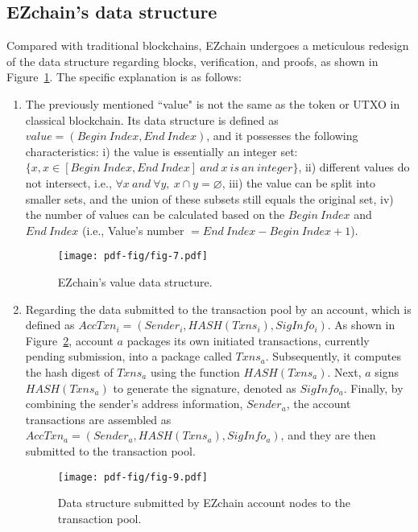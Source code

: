 \documentclass[conference]{IEEEtran}
\begin{document}
\subsection{EZchain's data structure}
\label{subsec:EZchain's data structure}
Compared with traditional blockchains, EZchain undergoes a meticulous redesign of the data structure regarding blocks, verification, and proofs, as shown in Figure~\ref{fig:value data structure}. The specific explanation is as follows:
\begin{enumerate}
    \item The previously mentioned ``value" is not the same as the token or UTXO in classical blockchain. Its data structure is defined as $value=(Begin~Index, End~Index)$, and it possesses the following characteristics: i) the value is essentially an integer set: $\{x, x \in [Begin~Index, End~Index]~and~x~is~an~integer\}$, ii) different values do not intersect, i.e., $\forall{x}~and~\forall{y},~x \cap y = \varnothing$, iii) the value can be split into smaller sets, and the union of these subsets still equals the original set, iv) the number of values can be calculated based on the $Begin~Index$ and $End~Index$ (i.e., Value's number $= End~Index - Begin~Index + 1$).
    \begin{figure}[htp!]
        \centering
        \texttt{[image: pdf-fig/fig-7.pdf]}
        \caption{EZchain's value data structure.}
        \label{fig:value data structure}
    \end{figure}

    \item Regarding the data submitted to the transaction pool by an account, which is defined as $AccTxn_i = (Sender_i, HASH(Txns_i), SigInfo_i)$. As shown in Figure~\ref{fig:account node submit data}, account $a$ packages its own initiated transactions, currently pending submission, into a package called $Txns_a$. Subsequently, it computes the hash digest of $Txns_a$ using the function $HASH(Txns_a)$. Next, $a$ signs $HASH(Txns_a)$ to generate the signature, denoted as $SigInfo_a$. Finally, by combining the sender's address information, $Sender_a$, the account transactions are assembled as $AccTxn_a = (Sender_a, HASH(Txns_a), SigInfo_a)$, and they are then submitted to the transaction pool.
    \begin{figure}[htp!]
        \centering
        \texttt{[image: pdf-fig/fig-9.pdf]}
        \caption{Data structure submitted by EZchain account nodes to the transaction pool.}
        \label{fig:account node submit data}
    \end{figure}


\end{enumerate}
\end{document}
